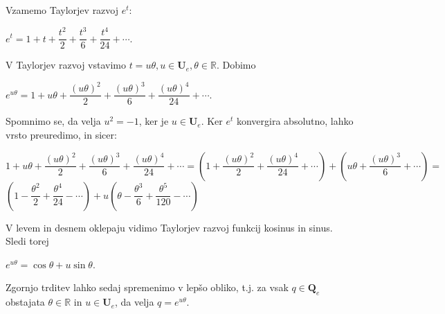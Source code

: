 \documentclass[a4paper,12pt]{article}
\def\R{\mathbb{R}} %
\def\Qe{\textbf{Q}_{e}} %
\def\Ue{\textbf{U}_{e}} %
\begin{document}
Vzamemo Taylorjev razvoj $e^t$:
\begin{center}
   $e^t = 1+t+\dfrac{t^2}{2}+\dfrac{t^3}{6}+\dfrac{t^4}{24} + \cdots$.
\end{center}
V Taylorjev razvoj vstavimo $t = u\theta, u \in \Ue, \theta \in \R$. Dobimo %
\begin{center}
   $e^{u\theta} = 1 + u\theta + \dfrac{(u\theta)^2}{2} + \dfrac{(u\theta)^3}{6} + \dfrac{(u\theta)^4}{24} + \cdots$.
\end{center}
Spomnimo se, da velja $u^2=-1$, ker je $u \in \Ue$. Ker $e^t$ konvergira absolutno, lahko vrsto preuredimo, in sicer:
\begin{center}
   $1 + u\theta + \dfrac{(u\theta)^2}{2} + \dfrac{(u\theta)^3}{6} + \dfrac{(u\theta)^4}{24} + \cdots = (1 + \dfrac{(u\theta)^2}{2} + \dfrac{(u\theta)^4}{24}+ \cdots) + (u\theta + \dfrac{(u\theta)^3}{6} + \cdots) = $
   $(1-\dfrac{\theta^2}{2}+\dfrac{\theta^4}{24}- \cdots) + u(\theta - \dfrac{\theta^3}{6} +\dfrac{\theta^5}{120} - \cdots)$
\end{center}
V levem in desnem oklepaju vidimo Taylorjev razvoj funkcij kosinus in sinus. Sledi torej
\begin{center}
   $e^{u\theta} = \cos\theta  + u\sin\theta$.
\end{center}
Zgornjo trditev lahko sedaj spremenimo v lepšo obliko, t.j. za vsak $q \in \Qe$ obstajata
$\theta \in \R$ in $u \in \Ue$, da velja $q =  e^{u\theta}$.
\end{document}
